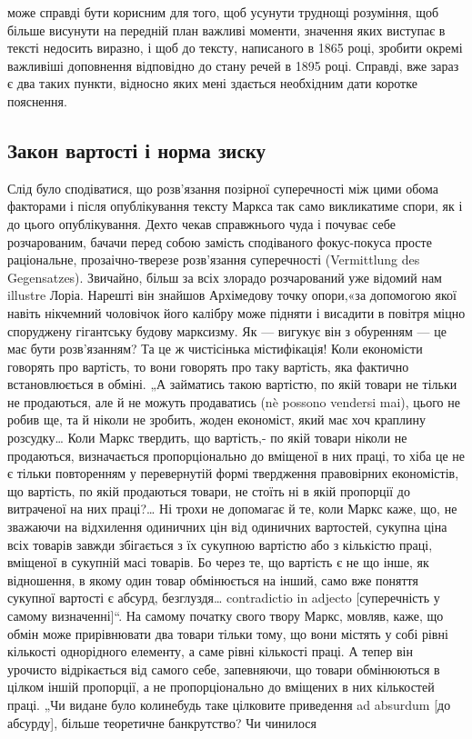 \parcont{}  %
може справді бути корисним для того, щоб усунути труднощі розуміння, щоб більше висунути на
передній план важливі моменти, значення яких виступає в тексті недосить виразно, і щоб до
тексту, написаного в 1865 році, зробити окремі важливіші доповнення відповідно до стану речей в
1895 році. Справді, вже зараз є два таких пункти, відносно яких мені здається необхідним дати
коротке пояснення.

\subsection{Закон вартості і норма зиску}

Слід було сподіватися, що розв’язання позірної суперечності між цими обома факторами і після
опублікування тексту Маркса так само викликатиме спори, як і до цього опублікування. Дехто чекав
справжнього чуда і почуває себе розчарованим, бачачи перед собою замість сподіваного фокус-покуса
просте раціональне, прозаічно-тверезе розв’язання суперечності (Vermittlung
des Gegensatzes). Звичайно, більш за всіх злорадо розчарований уже відомий нам illustre Лоріа.
Нарешті він знайшов Архімедову точку опори,«за допомогою якої навіть нікчемний чоловічок його
калібру може підняти і висадити в повітря міцно споруджену гігантську будову марксизму. Як —
вигукує він з обуренням — це має бути розв’язанням? Та це ж чистісінька містифікація! Коли
економісти говорять про вартість, то вони говорять про таку вартість, яка фактично встановлюється
в обміні. „А займатись такою вартістю, по якій товари не тільки не продаються, але й не можуть
продаватись (nè possono vendersi mai), цього не робив ще, та й ніколи не зробить, жоден
економіст, який має хоч краплину розсудку\dots{} Коли Маркс твердить, що вартість,- по якій товари
ніколи не продаються, визначається пропорціонально до вміщеної в них праці, то хіба це не є тільки повторенням у
перевернутій формі твердження правовірних економістів, що вартість, по
якій продаються товари, не стоїть ні в якій пропорції до витраченої на них праці?\dots{} Ні трохи не
допомагає й те, коли Маркс каже, що, не зважаючи
на відхилення одиничних цін від одиничних вартостей, сукупна ціна всіх товарів завжди збігається
з їх сукупною вартістю або з кількістю праці, вміщеної в сукупній масі товарів. Бо через те, що
вартість є не що інше, як відношення, в якому один товар обмінюється на інший, само вже поняття
сукупної вартості є абсурд, безглуздя\dots{} contradictio in adjecto [суперечність у самому визначенні]“. На самому
початку свого твору Маркс, мовляв, каже, що обмін може прирівнювати два товари
тільки тому, що вони містять у собі рівні кількості однорідного елементу, а саме рівні кількості
праці. А тепер він урочисто відрікається від самого себе, запевняючи, що товари обмінюються в
цілком іншій пропорції, а не
пропорціонально до вміщених в них кількостей праці. „Чи видане було колинебудь таке цілковите
приведення ad absurdum [до абсурду], більше теоретичне банкрутство? Чи чинилося
\parbreak{}  %
